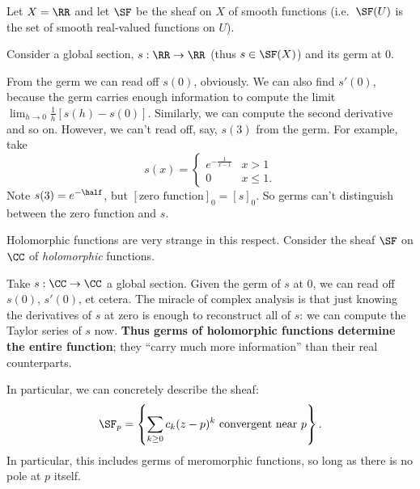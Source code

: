 \documentclass[11pt]{scrreprt}
\begin{document}
\begin{example}
	Let $X = \RR$ and let $\SF$ be the sheaf on $X$ of smooth functions
	(i.e.\ $\SF(U)$ is the set of smooth real-valued functions on $U$).

	Consider a global section, $s : \RR \to \RR$ (thus $s \in \SF(X)$)
	and its germ at $0$.
	\begin{enumerate}[(a)]
		\ii From the germ we can read off $s(0)$, obviously.
		\ii We can also find $s'(0)$, because the germ carries enough
		information to compute the limit $\lim_{h \to 0} \frac1h[s(h)-s(0)]$.
		\ii Similarly, we can compute the second derivative and so on.
		\ii However, we can't read off, say, $s(3)$ from the germ.
		For example, take
		\[
			s(x) = \begin{cases}
				e^{-\frac{1}{x-1}} & x > 1 \\
				0 & x \le 1.
			\end{cases}
		\]
		Note $s(3) = e^{-\half}$, but $[\text{zero function}]_0 = [s]_0$.
		So germs can't distinguish between the zero function and $s$.
	\end{enumerate}
\end{example}
\begin{example}
	Holomorphic functions are very strange in this respect.
	Consider the sheaf $\SF$ on $\CC$ of \emph{holomorphic} functions.

	Take $s : \CC \to \CC$ a global section.
	Given the germ of $s$ at $0$, we can read off $s(0)$, $s'(0)$, et cetera.
	The miracle of complex analysis is that just knowing
	the derivatives of $s$ at zero is enough to reconstruct all of $s$:
	we can compute the Taylor series of $s$ now.
	\textbf{Thus germs of holomorphic functions determine the entire function};
	they ``carry much more information'' than their real counterparts.
	
	In particular, we can concretely describe the sheaf:
	\[
		\SF_p = \left\{
			\sum_{k \ge 0} c_k (z-p)^k
			\text{ convergent near $p$}
		\right\}.
	\]
	In particular, this includes germs of meromorphic functions,
	so long as there is no pole at $p$ itself.
\end{example}
\end{document}
